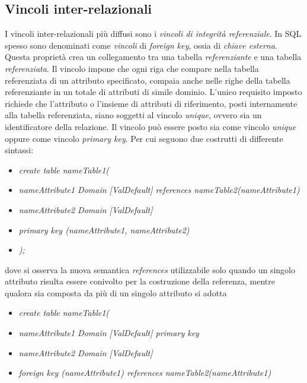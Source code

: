 \documentclass{article}
\begin{document}
\subsection*{Vincoli inter-relazionali}
I vincoli inter-relazionali più diffusi sono i \textit{vincoli di integrità referenziale}. In SQL spesso sono denominati come \textit{vincoli} di \textit{foreign key}, ossia di \textit{chiave esterna}. Questa proprietà crea un collegamento tra una tabella \textit{referenziante} e una tabella \textit{referenziata}. Il vincolo impone che ogni riga che compare nella tabella referenziata di un attributo specificato, compaia anche nelle righe della tabella referenziante in un totale di attributi di simile dominio. L'unico requisito imposto richiede che l'attributo o l'insieme di attributi di riferimento, posti internamente alla tabella referenziata, siano soggetti al vincolo \textit{unique}, ovvero sia un identificatore della relazione. Il vincolo può essere posto sia come vincolo \textit{unique} oppure come vincolo \textit{primary key}. Per cui seguono due costrutti di differente sintassi:
\begin{itemize}[label={ }, leftmargin=1cm]
    \item \textit{create table nameTable1(}
\end{itemize}
\begin{itemize}[label={ }, leftmargin=2cm]
    \itemsep0em
    \item \textit{nameAttribute1 Domain [ValDefault] references nameTable2(nameAttribute1)}
    \item \textit{nameAttribute2 Domain [ValDefault]}
    \item \textit{primary key (nameAttribute1, nameAttribute2)}
\end{itemize}
\begin{itemize}[label={ }, leftmargin=1cm]
    \item \textit{);}
\end{itemize}
dove si osserva la nuova semantica \textit{references} utilizzabile solo quando un singolo attributo risulta essere conivolto per la costruzione della referenza, mentre qualora sia composta da più di un singolo attributo si adotta
\begin{itemize}[label={ }, leftmargin=1cm]
    \item \textit{create table nameTable1(}
\end{itemize}
\begin{itemize}[label={ }, leftmargin=2cm]
    \itemsep0em
    \item \textit{nameAttribute1 Domain [ValDefault] primary key}
    \item \textit{nameAttribute2 Domain [ValDefault]}
    \item \textit{foreign key (nameAttribute1) references nameTable2(nameAttribute1)}
\end{itemize}
\end{document}
